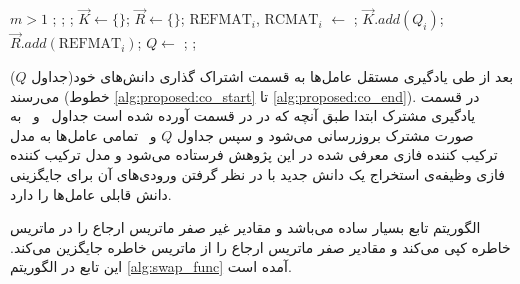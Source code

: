 \begin{algorithm}[t]
\caption{}\label{alg:proposed}
\begin{latin}
\begin{algorithmic}[1]
\Require $m > 1$ 
;
;
;
		 \label{alg:proposed:q_start}
		\label{alg:proposed:il_start}
		 \label{alg:proposed:q_end}
		 \label{alg:proposed:update_refmat}
		\label{alg:proposed:il_end}
		\State $\vec{K} \gets \{\}$; \label{alg:proposed:co_start}
		\State $\vec{R} \gets \{\}$;
			\State $\text{REFMAT}_i$, $\text{RCMAT}_i$ $\gets$ ;
			\State $\vec{K}.add(Q_i)$;
			\State $\vec{R}.add(\text{REFMAT}_i)$;
		\EndFor
		\State $Q \gets$ ; \label{alg:proposed:FCI_Combiner}
		\label{alg:proposed:QCO_replacement}
		;
		\label{alg:proposed:co_end}
	\EndIf
\EndWhile
\EndProcedure
\end{algorithmic}
\end{latin}
\end{algorithm}

بعد از طی یادگیری مستقل عامل‌ها به قسمت اشتراک گذاری دانش‌های خود(جداول $Q$) می‌رسند (خطوط
\ref{alg:proposed:co_start} تا \ref{alg:proposed:co_end}).
در قسمت یادگیری مشترک ابتدا طبق آنچه که در در قسمت آورده شده است جداول \ و \ به صورت مشترک بروزرسانی می‌شود و سپس جداول $Q$ و \ تمامی عامل‌ها به مدل ترکیب کننده فازی معرفی شده در این پژوهش فرستاده می‌شود و مدل ترکیب کننده فازی وظیفه‌ی استخراج یک دانش جدید با در نظر گرفتن ورودی‌های آن برای جایگزینی دانش قابلی عامل‌ها را دارد.

الگوریتم تابع  بسیار ساده می‌باشد و مقادیر غیر صفر ماتریس ارجاع را در ماتریس خاطره کپی می‌کند و مقادیر صفر ماتریس ارجاع را از ماتریس خاطره جایگزین می‌کند. این تابع در الگوریتم
\ref{alg:swap_func}
آمده است.


